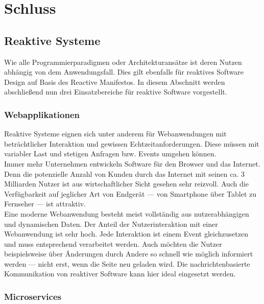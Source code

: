 \chapter{Schluss}
\vspace{-0.5cm}

\section{Reaktive Systeme}
Wie alle Programmierparadigmen oder Architekturansätze ist deren Nutzen abhängig von dem Anwendungsfall. Dies gilt ebenfalls für reaktives Software Design auf Basis des Reactive Manifestos. In diesem Abschnitt werden abschließend nun drei Einsatzbereiche für reaktive Software vorgestellt.\\

\vspace{-0.5cm}
\subsection{Webapplikationen}
Reaktive Systeme eignen sich unter anderem für Webanwendungen mit beträchtlicher Interaktion und gewissen Echtzeitanforderungen. Diese müssen mit variabler Last und stetigen Anfragen bzw. Events umgehen können.\\
Immer mehr Unternehmen entwickeln Software für den Browser und das Internet. Denn die potenzielle Anzahl von Kunden durch das Internet mit seinen ca. 3 Milliarden Nutzer ist aus wirtschaftlicher Sicht gesehen sehr reizvoll. Auch die Verfügbarkeit auf jeglicher Art von Endgerät --- von Smartphone über Tablet zu Fernseher --- ist attraktiv.\\
Eine moderne Webanwendung besteht meist vollständig aus nutzerabhängigen und dynamischen Daten. Der Anteil der Nutzerinteraktion mit einer Webanwendung ist sehr hoch. Jede Interaktion ist einem Event gleichzusetzen und muss entsprechend verarbeitet werden. Auch möchten die Nutzer beispielsweise über Änderungen durch Andere so schnell wie möglich informiert werden --- nicht erst, wenn die Seite neu geladen wird. Die nachrichtenbasierte Kommunikation von reaktiver Software kann hier ideal eingesetzt werden.\\

\subsection{Microservices}

